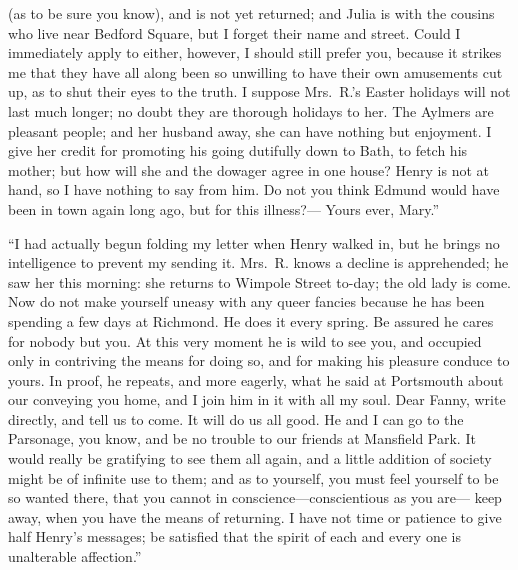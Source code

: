 \documentclass{article}
\begin{document}
(as to be sure you know), and is not yet returned;
and Julia is with the cousins who live near Bedford Square,
but I forget their name and street.  Could I immediately
apply to either, however, I should still prefer you,
because it strikes me that they have all along been so
unwilling to have their own amusements cut up, as to shut
their eyes to the truth.  I suppose Mrs.\ R.'s Easter
holidays will not last much longer; no doubt they are
thorough holidays to her.  The Aylmers are pleasant people;
and her husband away, she can have nothing but enjoyment.
I give her credit for promoting his going dutifully down
to Bath, to fetch his mother; but how will she and the
dowager agree in one house?  Henry is not at hand, so I
have nothing to say from him.  Do not you think Edmund would
have been in town again long ago, but for this illness?---%
Yours ever, Mary.''

``I had actually begun folding my letter when Henry walked in,
but he brings no intelligence to prevent my sending it.
Mrs.\ R. knows a decline is apprehended; he saw her this morning:
she returns to Wimpole Street to-day; the old lady is come.
Now do not make yourself uneasy with any queer fancies
because he has been spending a few days at Richmond.
He does it every spring.  Be assured he cares for nobody
but you.  At this very moment he is wild to see you,
and occupied only in contriving the means for doing so,
and for making his pleasure conduce to yours.  In proof,
he repeats, and more eagerly, what he said at Portsmouth
about our conveying you home, and I join him in it with all
my soul.  Dear Fanny, write directly, and tell us to come.
It will do us all good.  He and I can go to the Parsonage,
you know, and be no trouble to our friends at Mansfield Park.
It would really be gratifying to see them all again, and a
little addition of society might be of infinite use to them;
and as to yourself, you must feel yourself to be so wanted there,
that you cannot in conscience---conscientious as you are---%
keep away, when you have the means of returning.
I have not time or patience to give half Henry's messages;
be satisfied that the spirit of each and every one is
unalterable affection.''
\end{document}
